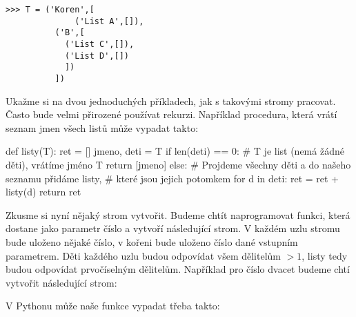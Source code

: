 \begin{center}
\begin{minipage}{7cm}
\begin{verbatim}
>>> T = ('Koren',[
	          ('List A',[]),
		  ('B',[
			('List C',[]),
			('List D',[])
			])
		  ])
\end{verbatim}
\end{minipage}
\begin{minipage}{3.5cm}
\end{minipage}
\end{center}

Ukažme si na dvou jednoduchých příkladech, jak s takovými stromy pracovat. Často bude velmi přirozené používat rekurzi. Například procedura,
která vrátí seznam jmen všech listů může vypadat takto:

\begin{python}
def listy(T):
  ret = []
  jmeno, deti = T
  if len(deti) == 0:
    # T je list (nemá žádné děti), vrátíme jméno T
    return [jmeno]
  else:
    # Projdeme všechny děti a do našeho seznamu přidáme listy,
    # které jsou jejich potomkem
    for d in deti:
      ret = ret + listy(d)
  return ret
\end{python}

Zkusme si nyní nějaký strom vytvořit. Budeme chtít naprogramovat funkci, která dostane jako parametr číslo a vytvoří následující strom. V každém uzlu
stromu bude uloženo nějaké číslo, v kořeni bude uloženo číslo dané vstupním parametrem. Děti každého uzlu budou odpovídat všem dělitelům $>1$, listy
tedy budou odpovídat prvočíselným dělitelům. Například pro číslo dvacet budeme chtí vytvořit následující strom:
\begin{center}
\end{center}

V Pythonu může naše funkce vypadat třeba takto:


